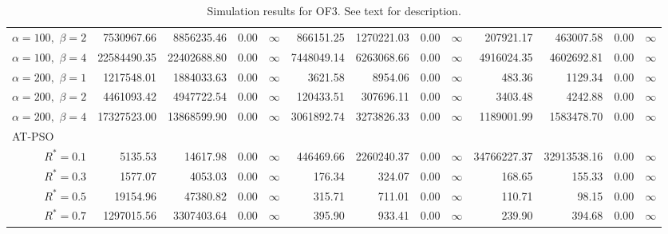 \documentclass[12pt]{article}
\begin{document}
\begin{table}[ht]
{\begin{tabular}{r|rrrr|rrrr|rrrr}
  $\alpha = 100,$ $\beta =2$ & 7530967.66 & 8856235.46 & 0.00 & $\infty$ & 866151.25 & 1270221.03 & 0.00 & $\infty$ & 207921.17 & 463007.58 & 0.00 & $\infty$ \\ 
  $\alpha = 100,$ $\beta =4$ & 22584490.35 & 22402688.80 & 0.00 & $\infty$ & 7448049.14 & 6263068.66 & 0.00 & $\infty$ & 4916024.35 & 4602692.81 & 0.00 & $\infty$ \\ 
  $\alpha = 200,$ $\beta =1$ & 1217548.01 & 1884033.63 & 0.00 & $\infty$ & 3621.58 & 8954.06 & 0.00 & $\infty$ & 483.36 & 1129.34 & 0.00 & $\infty$ \\ 
  $\alpha = 200,$ $\beta =2$ & 4461093.42 & 4947722.54 & 0.00 & $\infty$ & 120433.51 & 307696.11 & 0.00 & $\infty$ & 3403.48 & 4242.88 & 0.00 & $\infty$ \\ 
  $\alpha = 200,$ $\beta =4$ & 17327523.00 & 13868599.90 & 0.00 & $\infty$ & 3061892.74 & 3273826.33 & 0.00 & $\infty$ & 1189001.99 & 1583478.70 & 0.00 & $\infty$ \\ 
\hline
\multicolumn{1}{l|}{AT-PSO} &&&&&&&&&&&&\\
  $R^* = 0.1$ & 5135.53 & 14617.98 & 0.00 & $\infty$ & 446469.66 & 2260240.37 & 0.00 & $\infty$ & 34766227.37 & 32913538.16 & 0.00 & $\infty$ \\ 
  $R^* = 0.3$ & 1577.07 & 4053.03 & 0.00 & $\infty$ & 176.34 & 324.07 & 0.00 & $\infty$ & 168.65 & 155.33 & 0.00 & $\infty$ \\ 
  $R^* = 0.5$ & 19154.96 & 47380.82 & 0.00 & $\infty$ & 315.71 & 711.01 & 0.00 & $\infty$ & 110.71 & 98.15 & 0.00 & $\infty$ \\ 
  $R^* = 0.7$ & 1297015.56 & 3307403.64 & 0.00 & $\infty$ & 395.90 & 933.41 & 0.00 & $\infty$ & 239.90 & 394.68 & 0.00 & $\infty$ \\ 
   \hline
\end{tabular}
}
\caption{Simulation results for OF3. See text for description.}
\label{tab:psosim3}
\end{table}
\end{document}
